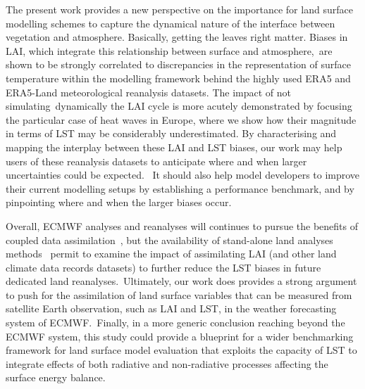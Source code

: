 \documentclass[gmd, manuscript]{copernicus}
\begin{document}
{The present work provides a new perspective on the importance for land
surface modelling schemes to capture the dynamical nature of the
interface between vegetation and atmosphere. Basically, getting the
leaves right matter. Biases in LAI, which integrate this relationship
between surface and atmosphere,~are shown to be strongly correlated to
discrepancies in the representation of surface temperature within the
modelling framework behind the highly used ERA5 and ERA5-Land
meteorological reanalysis datasets. The impact of not
simulating~dynamically the LAI cycle is more acutely demonstrated by
focusing the particular case of heat waves in Europe, where we show how
their magnitude in terms of LST may be considerably underestimated. By
characterising and mapping the interplay between these LAI and LST
biases, our work may help users of these reanalysis datasets to
anticipate where and when larger uncertainties could be expected.~ It
should also help model developers to improve their current modelling
setups by establishing a performance benchmark, and by pinpointing where
and when the larger biases occur.~

Overall, ECMWF analyses and reanalyses will continues to pursue the
benefits of coupled data assimilation~\citep{de_Rosnay_2022}, but the
availability of stand-alone land analyses methods~\citep{Fairbairn_2019}
permit to examine the impact of assimilating LAI (and other land climate
data records datasets) to further reduce the LST biases in future
dedicated land reanalyses.~Ultimately, our work does provides a strong
argument to push for the assimilation of land surface variables that can
be measured from satellite Earth observation, such as LAI and LST, in
the weather forecasting system of ECMWF.~Finally, in a more generic
conclusion reaching beyond the ECMWF system, this study could provide a
blueprint for a wider benchmarking framework for land surface model
evaluation that exploits the capacity of LST to integrate effects of
both radiative and non-radiative processes affecting the surface energy
balance.




}
\end{document}
